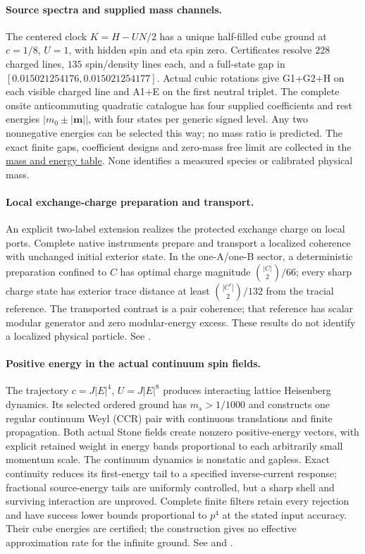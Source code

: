 \paragraph{Source spectra and supplied mass channels.}
The centered clock $K=H-UN/2$ has a unique half-filled cube ground at
$c=1/8$, $U=1$, with hidden spin and eta spin zero. Certificates resolve
$228$ charged lines, $135$ spin/density lines each, and a full-state gap in
$[0.015021254176,0.015021254177]$. Actual cubic rotations give G1+G2+H on
each visible charged line and A1+E on the first neutral triplet.
The complete onsite anticommuting quadratic catalogue has four supplied
coefficients and rest energies $|m_0\pm|\mathbf m||$, with four states per
generic signed level. Any two nonnegative energies can be selected this
way; no mass ratio is predicted. The exact finite gaps, coefficient designs
and zero-mass free limit are collected in the
\href{https://github.com/FloatingPragma/observer-patch-holography/blob/r2068/model/completion/PARTICLE_MASS_TABLE.md}{mass and energy table}.
None identifies a measured species or calibrated physical mass.

\paragraph{Local exchange-charge preparation and transport.}
An explicit two-label extension realizes the protected exchange charge on
local ports. Complete native instruments prepare and transport a localized
coherence with unchanged initial exterior state. In the one-A/one-B sector,
a deterministic preparation confined to $C$ has optimal charge magnitude
$\binom{|C|}{2}/66$; every sharp charge state has exterior trace distance
at least $\binom{|C^c|}{2}/132$ from the tracial reference.
The transported contrast is a pair coherence; that reference has scalar
modular generator and zero modular-energy excess. These results do not
identify a localized physical particle. See .

\paragraph{Positive energy in the actual continuum spin fields.}
The trajectory $c=J|E|^4$, $U=J|E|^8$ produces interacting lattice
Heisenberg dynamics. Its selected ordered ground has $m_s>1/1000$ and
constructs one regular continuum Weyl (CCR) pair with continuous
translations and finite propagation. Both actual Stone fields create
nonzero positive-energy vectors, with explicit retained weight in energy
bands proportional to each arbitrarily small momentum scale. The continuum
dynamics is nonstatic and gapless. Exact continuity reduces its first-energy
tail to a specified inverse-current response; fractional source-energy tails
are uniformly controlled, but a sharp shell and surviving interaction are unproved.
Complete finite filters retain every rejection and have success lower bounds
proportional to $p^4$ at the stated input accuracy. Their cube energies are certified;
the construction gives no effective approximation rate for the infinite ground.
See  and .

